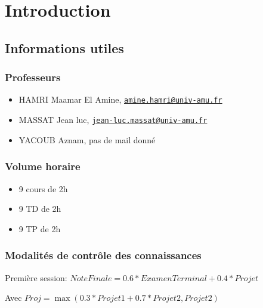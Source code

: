 \hypertarget{introduction}{%
\section{Introduction}\label{introduction}}

\hypertarget{informations-utiles}{%
\subsection{Informations utiles}\label{informations-utiles}}

\hypertarget{professeurs}{%
\subsubsection{Professeurs}\label{professeurs}}

\begin{itemize}
\tightlist
\item
  HAMRI Maamar El Amine,
  \href{mailto:amine.hamri@univ-amu.fr}{\nolinkurl{amine.hamri@univ-amu.fr}}
\item
  MASSAT Jean luc,
  \href{mailto:jean-luc.massat@univ-amu.fr}{\nolinkurl{jean-luc.massat@univ-amu.fr}}
\item
  YACOUB Aznam, pas de mail donné
\end{itemize}

\hypertarget{volume-horaire}{%
\subsubsection{Volume horaire}\label{volume-horaire}}

\begin{itemize}
\tightlist
\item
  9 cours de 2h
\item
  9 TD de 2h
\item
  9 TP de 2h
\end{itemize}

\hypertarget{modalituxe9s-de-contruxf4le-des-connaissances}{%
\subsubsection{Modalités de contrôle des
connaissances}\label{modalituxe9s-de-contruxf4le-des-connaissances}}

Première session: \(NoteFinale = 0.6 * ExamenTerminal + 0.4 * Projet\)

Avec \(Proj = \max(0.3 * Projet1 + 0.7 * Projet2, Projet2)\)

